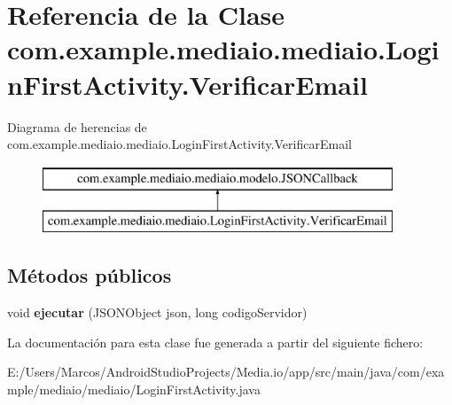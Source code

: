 \hypertarget{classcom_1_1example_1_1mediaio_1_1mediaio_1_1_login_first_activity_1_1_verificar_email}{}\section{Referencia de la Clase com.\+example.\+mediaio.\+mediaio.\+Login\+First\+Activity.\+Verificar\+Email}
\label{classcom_1_1example_1_1mediaio_1_1mediaio_1_1_login_first_activity_1_1_verificar_email}
Diagrama de herencias de com.\+example.\+mediaio.\+mediaio.\+Login\+First\+Activity.\+Verificar\+Email\begin{figure}[H]
\begin{center}
\leavevmode
\includegraphics[height=2.000000cm]{classcom_1_1example_1_1mediaio_1_1mediaio_1_1_login_first_activity_1_1_verificar_email}
\end{center}
\end{figure}
\subsection*{Métodos públicos}
\begin{DoxyCompactItemize}
\item 
\mbox{\label{classcom_1_1example_1_1mediaio_1_1mediaio_1_1_login_first_activity_1_1_verificar_email_ad224a450bcbbf5e30a923c5f0e7e98fc}} 
void {\bfseries ejecutar} (J\+S\+O\+N\+Object json, long codigo\+Servidor)
\end{DoxyCompactItemize}


La documentación para esta clase fue generada a partir del siguiente fichero\+:\begin{DoxyCompactItemize}
\item 
E\+:/\+Users/\+Marcos/\+Android\+Studio\+Projects/\+Media.\+io/app/src/main/java/com/example/mediaio/mediaio/Login\+First\+Activity.\+java\end{DoxyCompactItemize}
